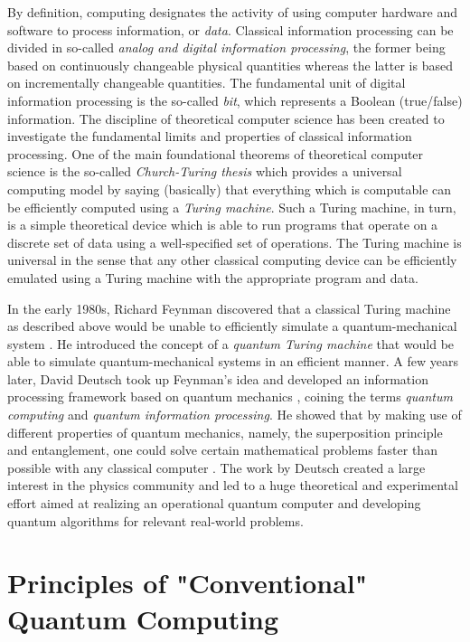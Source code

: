 By definition, computing designates the activity of using computer hardware and software to process information, or {\it data}. Classical information processing can be divided in so-called {\it analog and digital information processing}, the former being based on continuously changeable physical quantities whereas the latter is based on incrementally changeable quantities. The fundamental unit of digital information processing is the so-called {\it bit}, which represents a Boolean (true/false) information. The discipline of theoretical computer science has been created to investigate the fundamental limits and properties of classical information processing. One of the main foundational theorems of theoretical computer science is the so-called {\it Church-Turing thesis} which provides a universal computing model by saying (basically) that everything which is computable can be efficiently computed using a {\it Turing machine}. Such a Turing machine, in turn, is a simple theoretical device which is able to run programs that operate on a discrete set of data using a well-specified set of operations. The Turing machine is universal in the sense that any other classical computing device can be efficiently emulated using a Turing machine with the appropriate program and data.

\smallskip

In the early 1980s, Richard Feynman discovered that a classical Turing machine as described above would be unable to efficiently simulate a quantum-mechanical system \citep{feynman_simulating_1982}. He introduced the concept of a {\it quantum Turing machine} that would be able to simulate quantum-mechanical systems in an efficient manner. A few years later, David Deutsch took up Feynman's idea and developed an information processing framework based on quantum mechanics \citep{deutsch_quantum_1985}, coining the terms {\it quantum computing} and {\it quantum information processing}. He showed that by making use of different properties of quantum mechanics, namely, the superposition principle and entanglement, one could solve certain mathematical problems faster than possible with any classical computer \citep{deutsch_quantum_1985}. The work by Deutsch created a large interest in the physics community and led to a huge theoretical and experimental effort aimed at realizing an operational quantum computer and developing quantum algorithms for relevant real-world problems.

\section{Principles of "Conventional" Quantum Computing}


